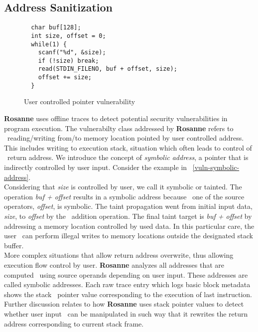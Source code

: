 \documentclass[format=acmsmall]{acmart}
\newcommand{\allcaps}[1]{\texorpdfstring{\textsmaller[.5]{#1}}{#1}\xspace}
\newcommand{\tool}{\textbf{Rosanne}}
\newcommand{\river}{\allcaps{RIVER}}
\begin{document}
\subsection{Address Sanitization}

\begin{figure}
\caption{User controlled pointer vulnerability}
\label{vuln-symbolic-address}
\begin{lstlisting}
  char buf[128];
  int size, offset = 0;
  while(1) {
    scanf("%d", &size);
    if (!size) break;
    read(STDIN_FILENO, buf + offset, size);
    offset += size;
  }
\end{lstlisting}
\end{figure}

{\tool} uses {\river} offline traces to detect potential security vulnerabilities in program execution. The vulnerabilty class addressed by {\tool} refers to \
reading/writing from/to memory location pointed by user controlled address. This includes writing to execution stack, situation which often leads to control of \
return address. We introduce the concept of \textit{symbolic address}, a pointer that is indirectly controlled by user input. Consider the example in \
\autoref{vuln-symbolic-address}. \\

Considering that \textit{size} is controlled by user, we call it symbolic or tainted. The operation \textit{buf + offset} results in a symbolic address because \
one of the source operators, \textit{offset}, is symbolic. The taint propagation went from initial input data, \textit{size}, to \textit{offset} by the \
addition operation. The final taint target is \textit{buf + offset} by addressing a memory location controlled by used data. In this particular care, the user \
can perform illegal writes to memory locations outside the designated stack buffer. \\

More complex situations that allow return address overwrite, thus allowing execution flow control by user. {\tool} analyzes all addresses that are computed \
using source operands depending on user input. These addresses are called symbolic addresses. Each raw trace entry which logs basic block metadata shows the stack \
pointer value corresponding to the execution of last instruction. Further discussion relates to how {\tool} uses stack pointer values to detect whether user input \
can be manipulated in such way that it rewrites the return address corresponding to current stack frame. \\
\end{document}
